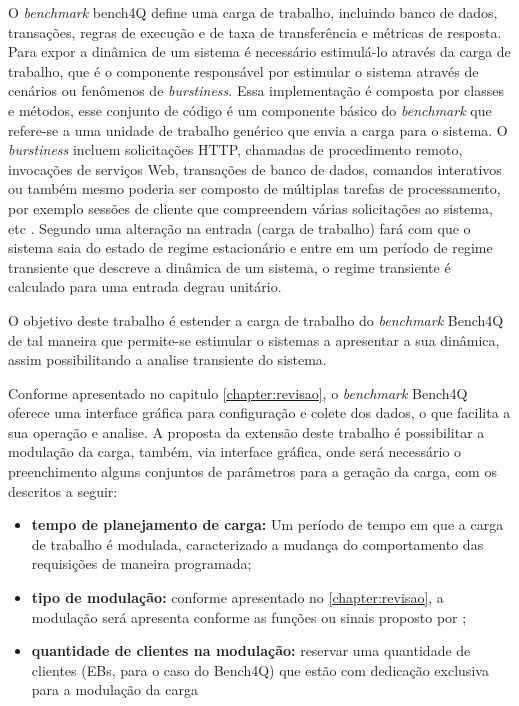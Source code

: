 O \textit{benchmark} bench4Q define uma carga de trabalho, incluindo banco de dados, transações, regras de execução e de taxa de transferência e métricas de resposta.  Para expor a dinâmica de um sistema é necessário estimulá-lo através da carga de trabalho, que é o componente responsável por estimular o sistema através de cenários ou fenômenos de \textit{burstiness}. Essa implementação é composta por classes e métodos, esse conjunto de código é um componente básico do \textit{benchmark} que refere-se a uma unidade de trabalho genérico que envia a carga para o sistema. O \textit{burstiness} incluem solicitações HTTP, chamadas de procedimento remoto, invocações de serviços Web, transações de banco de dados, comandos interativos ou também mesmo poderia ser composto de múltiplas tarefas de processamento, por exemplo sessões de cliente que compreendem várias solicitações ao sistema, etc \cite{Kounev2005}. Segundo \cite{Nobile2013} uma alteração na entrada (carga de trabalho) fará com que o sistema saia do estado de regime estacionário e entre em um período de regime transiente que descreve a dinâmica de um sistema, o regime transiente é calculado para uma entrada degrau unitário.

O objetivo deste trabalho é estender a carga de trabalho do \textit{benchmark} Bench4Q de tal maneira que permite-se estimular o sistemas a apresentar a sua dinâmica, assim possibilitando a analise transiente do sistema. 

Conforme apresentado no capitulo \ref{chapter:revisao}, o \textit{benchmark} Bench4Q oferece uma interface gráfica para configuração e colete dos dados, o que facilita a sua operação e analise. A proposta da extensão deste trabalho é possibilitar a modulação da carga, também, via interface gráfica, onde será necessário o preenchimento alguns conjuntos de parâmetros para a geração da carga, com os descritos a seguir:
\begin{itemize}
	\item \textbf{tempo de planejamento de carga:} Um período de tempo em que a carga de trabalho é modulada, caracterizado a mudança do comportamento das requisições de maneira programada;
	\item \textbf{tipo de modulação:} conforme apresentado no \ref{chapter:revisao}, a modulação será apresenta conforme as funções ou sinais proposto por \cite{Hellerstein2004};
	\item \textbf{quantidade de clientes na modulação:} reservar uma quantidade de clientes (EBs, para o caso do Bench4Q) que estão com dedicação exclusiva para a modulação da carga
\end{itemize}

